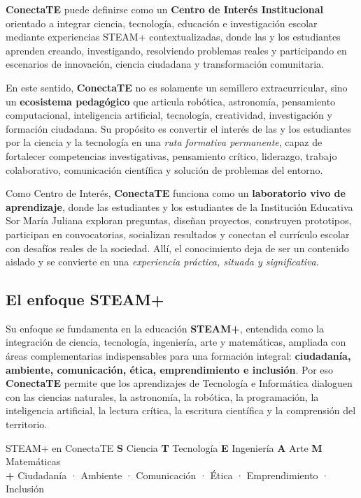 \documentclass[12pt, letterpaper]{article}
\newcommand{\conectate}{\textbf{ConectaTE}}
\begin{document}
\conectate{} puede definirse como un \textbf{Centro de Interés Institucional} orientado a integrar ciencia, tecnología, educación e investigación escolar mediante experiencias STEAM+ contextualizadas, donde las y los estudiantes aprenden creando, investigando, resolviendo problemas reales y participando en escenarios de innovación, ciencia ciudadana y transformación comunitaria.

En este sentido, \conectate{} no es solamente un semillero extracurricular, sino un \textbf{ecosistema pedagógico} que articula robótica, astronomía, pensamiento computacional, inteligencia artificial, tecnología, creatividad, investigación y formación ciudadana. Su propósito es convertir el interés de las y los estudiantes por la ciencia y la tecnología en una \textit{ruta formativa permanente}, capaz de fortalecer competencias investigativas, pensamiento crítico, liderazgo, trabajo colaborativo, comunicación científica y solución de problemas del entorno.

Como Centro de Interés, \conectate{} funciona como un \textbf{laboratorio vivo de aprendizaje}, donde las estudiantes y los estudiantes de la Institución Educativa Sor María Juliana exploran preguntas, diseñan proyectos, construyen prototipos, participan en convocatorias, socializan resultados y conectan el currículo escolar con desafíos reales de la sociedad. Allí, el conocimiento deja de ser un contenido aislado y se convierte en una \textit{experiencia práctica, situada y significativa}.

\subsection{El enfoque STEAM+}

Su enfoque se fundamenta en la educación \textbf{STEAM+}, entendida como la integración de ciencia, tecnología, ingeniería, arte y matemáticas, ampliada con áreas complementarias indispensables para una formación integral: \textbf{ciudadanía, ambiente, comunicación, ética, emprendimiento e inclusión}. Por eso \conectate{} permite que los aprendizajes de Tecnología e Informática dialoguen con las ciencias naturales, la astronomía, la robótica, la programación, la inteligencia artificial, la lectura crítica, la escritura científica y la comprensión del territorio.

\begin{cajaConcepto}{STEAM+ en ConectaTE}
\textbf{S} Ciencia \quad \textbf{T} Tecnología \quad \textbf{E} Ingeniería \quad \textbf{A} Arte \quad \textbf{M} Matemáticas\\
\textbf{+} Ciudadanía · Ambiente · Comunicación · Ética · Emprendimiento · Inclusión
\end{cajaConcepto}
\end{document}
